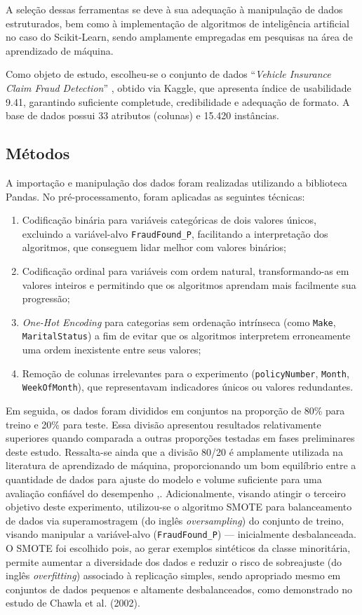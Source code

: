 \documentclass[conference]{IEEEtran}
\begin{document}
A seleção dessas ferramentas se deve à sua adequação à manipulação de dados estruturados, bem como à implementação de algoritmos de inteligência artificial no caso do Scikit-Learn, sendo amplamente empregadas em pesquisas na área de aprendizado de máquina.

Como objeto de estudo, escolheu-se o conjunto de dados ``\textit{Vehicle Insurance Claim Fraud Detection}'' \cite{b10}, obtido via Kaggle, que apresenta índice de usabilidade 9.41, garantindo suficiente completude, credibilidade e adequação de formato. A base de dados possui 33 atributos (colunas) e 15.420 instâncias.

\subsection{Métodos}
A importação e manipulação dos dados foram realizadas utilizando a biblioteca Pandas. No pré-processamento, foram aplicadas as seguintes técnicas:
\begin{enumerate}
    \item Codificação binária para variáveis categóricas de dois valores únicos, excluindo a variável-alvo \verb|FraudFound_P|, facilitando a interpretação dos algoritmos, que conseguem lidar melhor com valores binários;
    \item Codificação ordinal para variáveis com ordem natural, transformando-as em valores inteiros e permitindo que os algoritmos aprendam mais facilmente sua progressão;
    \item \textit{One-Hot Encoding} para categorias sem ordenação intrínseca (como \verb|Make|, \verb|MaritalStatus|) a fim de evitar que os algoritmos interpretem erroneamente uma ordem inexistente entre seus valores;
    \item Remoção de colunas irrelevantes para o experimento (\verb|policyNumber|, \verb|Month|, \verb|WeekOfMonth|), que representavam indicadores únicos ou valores redundantes.
\end{enumerate}

Em seguida, os dados foram divididos em conjuntos na proporção de 80\% para treino e 20\% para teste. Essa divisão apresentou resultados relativamente superiores quando comparada a outras proporções testadas em fases preliminares deste estudo. Ressalta-se ainda que a divisão 80/20 é amplamente utilizada na literatura de aprendizado de máquina, proporcionando um bom equilíbrio entre a quantidade de dados para ajuste do modelo e volume suficiente para uma avaliação confiável do desempenho \cite{b8},\cite{b9}. Adicionalmente, visando atingir o terceiro objetivo deste experimento, utilizou-se o algoritmo SMOTE \cite{b5} para balanceamento de dados via superamostragem (do inglês \textit{oversampling}) do conjunto de treino, visando manipular a variável-alvo (\verb|FraudFound_P|) — inicialmente desbalanceada. O SMOTE foi escolhido pois, ao gerar exemplos sintéticos da classe minoritária, permite aumentar a diversidade dos dados e reduzir o risco de sobreajuste (do inglês \textit{overfitting}) associado à replicação simples, sendo apropriado mesmo em conjuntos de dados pequenos e altamente desbalanceados, como demonstrado no estudo de Chawla et al. (2002)\cite{b5}.
\end{document}
